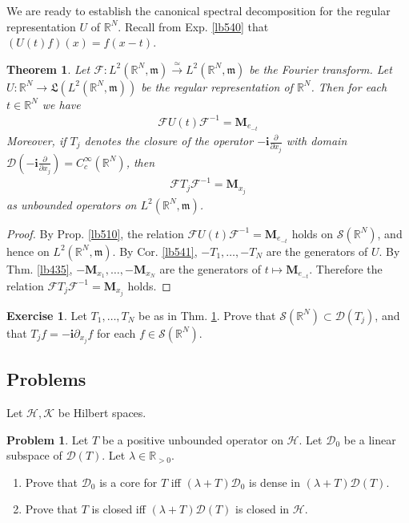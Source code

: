 \documentclass[12pt,b5paper,notitlepage]{article}
\theoremstyle{definition}
\newtheorem{exe}[df]{Exercise}
\newtheorem{prob}{\color{red}Problem}[section]
\theoremstyle{plain}
\newtheorem{thm}[df]{Theorem}
\newcommand{\fk}{\mathfrak}
\newcommand{\Dom}{\mathscr{D}}
\newcommand{\im}{\mathbf{i}}
\newcommand{\Rbb}{\mathbb R}
\newcommand{\mk}{\mathfrak m}
\newcommand{\MF}{\mathcal F}
\newcommand{\MH}{\mathcal H}
\newcommand{\MK}{\mathcal K}
\newcommand{\MS}{\mathcal S}
\newcommand{\Mbf}{\mathbf M}
\numberwithin{equation}{section}
\begin{document}
We are ready to establish the canonical spectral decomposition for the regular representation $U$ of $\Rbb^N$. Recall from Exp. \ref{lb540} that $(U(t)f)(x)=f(x-t)$.

\begin{thm}\label{lb559}
Let $\MF:L^2(\Rbb^N,\mk)\xrightarrow{\simeq}L^2(\Rbb^N,\mk)$ be the Fourier transform. Let $U:\Rbb^N\rightarrow\fk L(L^2(\Rbb^N,\mk))$ be the regular representation of $\Rbb^N$. Then for each $t\in\Rbb^N$ we have
\begin{align*}
\MF U(t)\MF^{-1}=\Mbf_{e_{-t}}
\end{align*}
Moreover, if $T_j$ denotes the closure of the operator $-\im\frac{\partial}{\partial x_j}$ with domain $\Dom(-\im\frac{\partial}{\partial x_j})=C_c^\infty(\Rbb^N)$, then
\begin{align*}
\MF T_j\MF^{-1}=\Mbf_{x_j}
\end{align*}
as unbounded operators on $L^2(\Rbb^N,\mk)$.
\end{thm}

\begin{proof}
By Prop. \ref{lb510}, the relation $\MF U(t)\MF^{-1}=\Mbf_{e_{-t}}$ holds on $\MS(\Rbb^N)$, and hence on $L^2(\Rbb^N,\mk)$. By Cor. \ref{lb541}, $-T_1,\dots,-T_N$ are the generators of $U$. By Thm. \ref{lb435}, $-\Mbf_{x_1},\dots,-\Mbf_{x_N}$ are the generators of $t\mapsto\Mbf_{e_{-t}}$. Therefore the relation $\MF T_j\MF^{-1}=\Mbf_{x_j}$ holds.
\end{proof}



\begin{exe}
Let $T_1,\dots,T_N$ be as in Thm. \ref{lb559}. Prove that $\MS(\Rbb^N)\subset\Dom(T_j)$, and that $T_jf=-\im\partial_{x_j}f$ for each $f\in\MS(\Rbb^N)$.
\end{exe}


\subsection{Problems}


Let $\MH,\MK$ be Hilbert spaces.


\begin{prob}\label{lb482}
Let $T$ be a positive unbounded operator on $\MH$. Let $\Dom_0$ be a linear subspace of $\Dom(T)$. Let $\lambda\in\Rbb_{>0}$.
\begin{enumerate}
\item Prove that $\Dom_0$ is a core for $T$ iff $(\lambda+T)\Dom_0$ is dense in $(\lambda+T)\Dom(T)$.
\item Prove that $T$ is closed iff $(\lambda+T)\Dom(T)$ is closed in $\MH$.
\end{enumerate} 
\end{prob}
\end{document}
